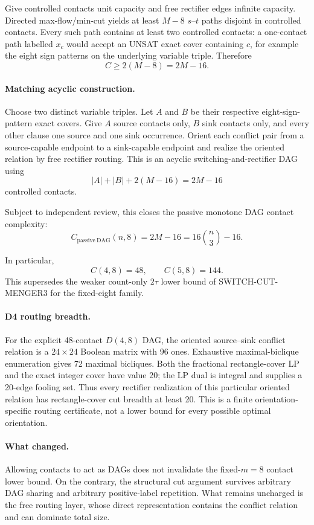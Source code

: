 Give controlled contacts unit capacity and free rectifier edges infinite capacity.  Directed
max-flow/min-cut yields at least $M-8$ $s$--$t$ paths disjoint in controlled contacts.
Every such path contains at least two controlled contacts: a one-contact path labelled
$x_c$ would accept an UNSAT exact cover containing $c$, for example the eight sign patterns
on the underlying variable triple.  Therefore
\[
C\ge2(M-8)=2M-16.
\]

\paragraph{Matching acyclic construction.}
Choose two distinct variable triples.  Let $A$ and $B$ be their respective eight-sign-pattern
exact covers.  Give $A$ source contacts only, $B$ sink contacts only, and every other clause
one source and one sink occurrence.  Orient each conflict pair from a source-capable endpoint
to a sink-capable endpoint and realize the oriented relation by free rectifier routing.
This is an acyclic switching-and-rectifier DAG using
\[
|A|+|B|+2(M-16)=2M-16
\]
controlled contacts.

Subject to independent review, this closes the passive monotone DAG contact complexity:
\[
\boxed{
C_{\mathrm{passive\ DAG}}(n,8)
=
2M-16
=
16\binom n3-16.
}
\]

In particular,
\[
C(4,8)=48,\qquad C(5,8)=144.
\]
This supersedes the weaker count-only $2\tau$ lower bound of SWITCH-CUT-MENGER3 for the
fixed-eight family.

\paragraph{D4 routing breadth.}
For the explicit 48-contact $D(4,8)$ DAG, the oriented source--sink conflict relation is a
$24\times24$ Boolean matrix with 96 ones.  Exhaustive maximal-biclique enumeration gives
72 maximal bicliques.  Both the fractional rectangle-cover LP and the exact integer cover
have value 20; the LP dual is integral and supplies a 20-edge fooling set.  Thus every
rectifier realization of this particular oriented relation has rectangle-cover cut breadth
at least 20.  This is a finite orientation-specific routing certificate, not a lower bound
for every possible optimal orientation.

\paragraph{What changed.}
Allowing contacts to act as DAGs does not invalidate the fixed-$m=8$ contact lower bound.
On the contrary, the structural cut argument survives arbitrary DAG sharing and arbitrary
positive-label repetition.  What remains uncharged is the free routing layer, whose direct
representation contains the conflict relation and can dominate total size.

